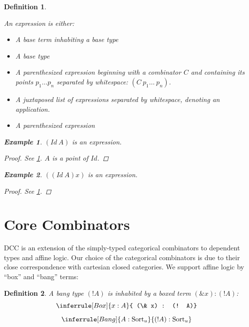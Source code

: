 \documentclass{article}
\newtheorem{definition}{Definition}
\newtheorem{example}{Example}
\newcommand{\sort}[1]{\text{Sort}_{#1}}
\begin{document}
\begin{definition}\label{def:syntax}

  An expression is either:

  \begin{itemize}
    \item A base term inhabiting a base type
    \item A base type
    \item A parenthesized expression beginning with a combinator \(C\) and containing its points \(p_1 \ldots p_n\) separated by whitespace: \((C\ p_1\ldots\ p_n)\).
    \item A juxtaposed list of expressions separated by whitespace, denoting an application.
    \item A parenthesized expression
    \end{itemize}

\begin{example}
  \((Id\ A)\) is an expression.
\end{example}

\begin{proof}
  See \ref{def:syntax}. \(A\) is a point of \(Id\).
\end{proof}

\begin{example}
  \(((Id\ A) x)\) is an expression.
\end{example}

\begin{proof}
  See \ref{def:syntax}.
\end{proof}

\end{definition}

\section{Core Combinators}

DCC is an extension of the simply-typed categorical combinators \autocite[p. 220]{CURIEN1986188} to dependent types and affine logic. Our choice of the categorical combinators is due to their close correspondence with cartesian closed categories. We support affine logic by ``box'' and ``bang'' terms:

\begin{definition}
  A bang type \((! A)\) is inhabited by a boxed term \((\& x) : (! A)\):
  \begin{equation}
  \inferrule[Box]
  { x : A }
  { (\& x) : (! A)}
\end{equation}
\begin{equation}
\inferrule[Bang]
{ A : \sort{u}}
{(!A) : \sort{u}}
\end{equation}
\end{definition}
\end{document}
